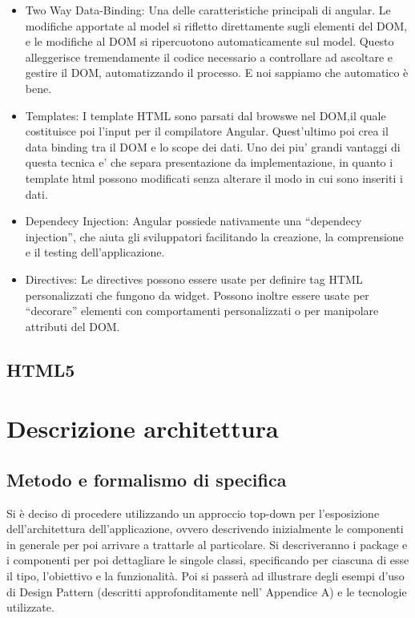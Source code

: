 \begin{itemize}
\item Two Way Data-Binding: Una delle caratteristiche principali di angular. Le modifiche apportate al model si rifletto direttamente sugli elementi del DOM, e le modifiche al DOM si ripercuotono automaticamente sul model. Questo alleggerisce tremendamente il codice necessario a controllare ad ascoltare e gestire il DOM, automatizzando il processo. E noi sappiamo che automatico \`{e} bene.
\item Templates: I template HTML sono parsati dal browswe nel DOM,il quale costituisce poi l’input per il compilatore Angular. Quest’ultimo poi crea il data binding tra il DOM e lo scope dei dati. Uno dei piu’ grandi vantaggi di questa tecnica e’ che separa presentazione da implementazione, in quanto i template html possono modificati senza alterare il modo in cui sono inseriti i dati.
\item Dependecy Injection: Angular possiede nativamente una “dependecy injection”, che aiuta gli sviluppatori facilitando la creazione, la comprensione e il testing dell’applicazione.
\item Directives: Le directives possono essere usate per definire tag HTML personalizzati che fungono da widget. Possono inoltre essere usate per “decorare” elementi con comportamenti personalizzati o per manipolare attributi del DOM. 

\end{itemize}

\subsection{HTML5}

\newpage
\section{Descrizione architettura}
\subsection{Metodo e formalismo di specifica}
Si è deciso di procedere utilizzando un approccio top-down per l’esposizione dell’architettura dell’applicazione, ovvero descrivendo inizialmente le componenti in generale per poi arrivare a trattarle al particolare.
Si descriveranno i package e i componenti per poi dettagliare le singole classi, specificando per ciascuna di esse il tipo, l’obiettivo e la funzionalità. Poi si passerà ad illustrare degli esempi d’uso di Design Pattern (descritti approfonditamente nell’ Appendice A) e le tecnologie utilizzate.


